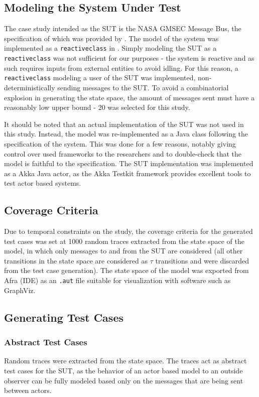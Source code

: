 \documentclass{article}
\begin{document}
	\subsection{Modeling the System Under Test}
	The case study intended as the SUT is the NASA GMSEC Message Bus, the specification of which was provided by \citeauthor{fraunhofer}. The model of the system was implemented as a \texttt{reactiveclass} in \Rebeca. Simply modeling the SUT as a \texttt{reactiveclass} was not sufficient for our purposes \-- the system is reactive and as such requires inputs from external entities to avoid idling. For this reason, a \texttt{reactiveclass} modeling a user of the SUT was implemented, non-deterministically sending messages to the SUT. To avoid a combinatorial explosion in generating the state space, the amount of messages sent must have a reasonably low upper bound \-- 20 was selected for this study.

	It should be noted that an actual implementation of the SUT was not used in this study. Instead, the model was re-implemented as a Java class following the specification of the system. This was done for a few reasons, notably giving control over used frameworks to the researchers and to double-check that the model is faithful to the specification. The SUT implementation was implemented as a Akka Java actor, as the Akka Testkit framework provides excellent tools to test actor based systems.

	\subsection{Coverage Criteria}
	Due to temporal constraints on the study, the coverage criteria for the generated test cases was set at 1000 random traces extracted from the state space of the model, in which only messages to and from the SUT are considered (all other transitions in the state space are considered as $\tau$ transitions and were discarded from the test case generation). The state space of the model was exported from Afra (\Rebeca IDE) as an \texttt{.aut} file suitable for visualization with software such as GraphViz.

	\subsection{Generating Test Cases}
	\subsubsection{Abstract Test Cases}
	Random traces were extracted from the state space. The traces act as abstract test cases for the SUT, as the behavior of an actor based model to an outside observer can be fully modeled based only on the messages that are being sent between actors.
\end{document}

